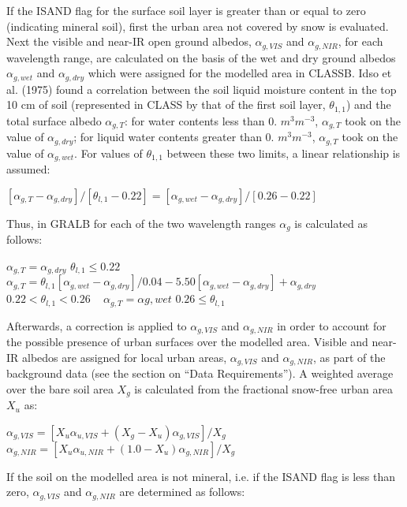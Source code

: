 If the I\+S\+A\+N\+D flag for the surface soil layer is greater than or equal to zero (indicating mineral soil), first the urban area not covered by snow is evaluated. Next the visible and near-\/\+I\+R open ground albedos, $\alpha_{g,VIS}$ and $\alpha_{g,NIR}$, for each wavelength range, are calculated on the basis of the wet and dry ground albedos $\alpha_{g,wet}$ and $\alpha_{g,dry}$ which were assigned for the modelled area in C\+L\+A\+S\+S\+B. Idso et al. (1975) found a correlation between the soil liquid moisture content in the top 10 cm of soil (represented in C\+L\+A\+S\+S by that of the first soil layer, $\theta_{1,1}$) and the total surface albedo $\alpha_{g,T}$\+: for water contents less than 0. $m^3 m^{-3}$, $\alpha_{g,T}$ took on the value of $\alpha_{g,dry}$; for liquid water contents greater than 0. $m^3 m^{-3}$, $\alpha_{g,T}$ took on the value of $\alpha_{g,wet}$. For values of $\theta_{1,1}$ between these two limits, a linear relationship is assumed\+:

$[\alpha_{g,T} - \alpha_{g,dry} ] / [\theta_{l,1} - 0.22] = [\alpha_{g,wet} - \alpha_{g,dry} ]/[0.26 - 0.22]$

Thus, in G\+R\+A\+L\+B for each of the two wavelength ranges $\alpha_{g}$ is calculated as follows\+:

$\alpha_{g,T} = \alpha_{g,dry}$ $\theta_{l,1} \leq 0.22 $ ~\newline
 $\alpha_{g,T} = \theta_{l,1} [\alpha_{g,wet} - \alpha_{g,dry} ]/0.04 - 5.50 [\alpha_{g,wet} - \alpha_{g,dry} ] + \alpha_{g,dry} $ $0.22 < \theta_{l,1} < 0.26 $ ~\newline
 $\alpha_{g,T} = \alpha{g,wet} $ $ 0.26 \leq \theta_{l,1}$

Afterwards, a correction is applied to $\alpha_{g,VIS}$ and $\alpha_{g,NIR}$ in order to account for the possible presence of urban surfaces over the modelled area. Visible and near-\/\+I\+R albedos are assigned for local urban areas, $\alpha_{g,VIS}$ and $\alpha_{g,NIR}$, as part of the background data (see the section on “\+Data Requirements”). A weighted average over the bare soil area $X_g$ is calculated from the fractional snow-\/free urban area $X_u$ as\+:

$\alpha_{g,VIS} = [X_u \alpha_{u,VIS} + (X_g-X_u ) \alpha_{g,VIS}] / X_g $~\newline
 $\alpha_{g,NIR} = [X_u \alpha_{u,NIR} + (1.0-X_u ) \alpha_{g,NIR}] / X_g $

If the soil on the modelled area is not mineral, i.\+e. if the I\+S\+A\+N\+D flag is less than zero, $\alpha_{g,VIS}$ and $\alpha_{g,NIR}$ are determined as follows\+:

